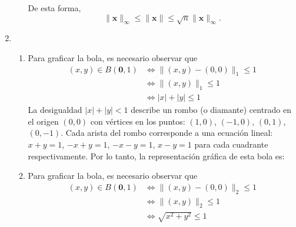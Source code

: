 \begin{enumerate}
\begin{enumerate}
        De esta forma,
        $$\| \mathbf{x} \|_{\infty} \leq \| \mathbf{x} \| \leq \sqrt{n} \| \mathbf{x} \|_{\infty}.$$
    \end{enumerate}
    \item \begin{enumerate}
        \item Para graficar la bola, es necesario observar que
        \begin{align*}
            (x, y) \in B(\mathbf{0}, 1) & \Longleftrightarrow \| (x, y) - (0, 0) \|_1 \leq 1 \\
            & \Longleftrightarrow \| (x, y) \|_1 \leq 1 \\
            & \Longleftrightarrow |x| + |y| \leq 1
        \end{align*}
        La desigualdad $|x| + |y| < 1$ describe un rombo (o diamante) centrado en el origen $(0, 0)$ con vértices en los puntos: $(1, 0)$, $(-1, 0)$, $(0, 1)$, $(0, -1)$. Cada arista del rombo corresponde a una ecuación lineal: $x + y = 1$, $-x + y = 1$, $-x - y = 1$, $x - y = 1$ para cada cuadrante respectivamente. Por lo tanto, la representación gráfica de esta bola es:
        \begin{center}
        \end{center}
        \item Para graficar la bola, es necesario observar que
        \begin{align*}
            (x, y) \in B(\mathbf{0}, 1) & \Longleftrightarrow \| (x, y) - (0, 0) \|_2 \leq 1 \\
            & \Longleftrightarrow \| (x, y) \|_2 \leq 1 \\
            & \Longleftrightarrow \sqrt{x^2 + y^2} \leq 1
        \end{align*}

\end{enumerate}
\end{enumerate}
